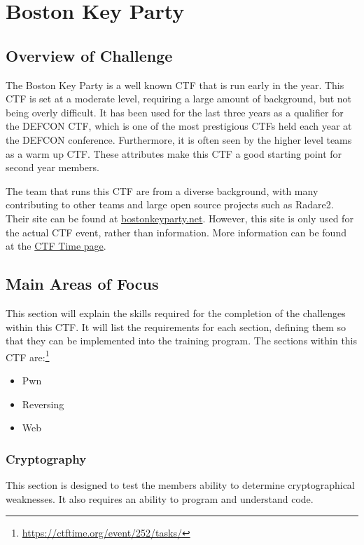 \documentclass[a4paper,11pt]{report}
\begin{document}
\chapter{Boston Key Party}
	\section{Overview of Challenge}
		The Boston Key Party is a well known CTF that is run early in the year. 
		This CTF is set at a moderate level, requiring a large amount of background, but not being overly difficult. 
		It has been used for the last three years as a qualifier for the DEFCON CTF, 
		which is one of the most prestigious CTFs held each year at the DEFCON conference. 
		Furthermore, it is often seen by the higher level teams as a warm up CTF. 
		These attributes make this CTF a good starting point for second year members. 

		The team that runs this CTF are from a diverse background, with many contributing to other teams and large open source projects such as Radare2.
		Their site can be found at \href{https://web.archive.org/web/20160131055956/http://bostonkeyparty.net/}{bostonkeyparty.net}. 
		However, this site is only used for the actual CTF event, rather than information. 
		More information can be found at the \href{https://ctftime.org/event/252}{CTF Time page}.
	\section{Main Areas of Focus}
		This section will explain the skills required for the completion of the challenges within this CTF. 
		It will list the requirements for each section, defining them so that they can be implemented into the training program. 
		The sections within this CTF are:\footnote{\url{https://ctftime.org/event/252/tasks/}}
		\begin{itemize}
			\item Pwn
			\item Reversing
			\item Web
		\end{itemize}
		\subsection{Cryptography}
			This section is designed to test the members ability to determine cryptographical weaknesses. 
			It also requires an ability to program and understand code. 
			
\end{document}
